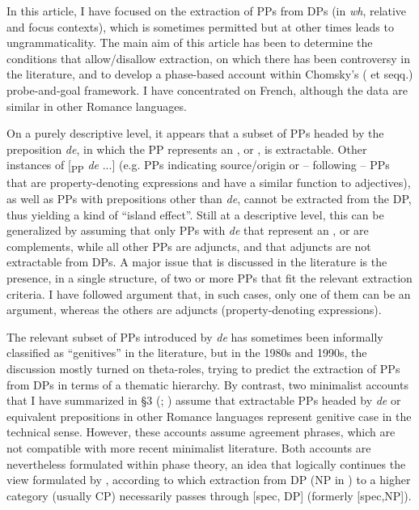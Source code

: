 \documentclass[output=paper]{langsci/langscibook}
\begin{document}
In this article, I have focused on the extraction of PPs from DPs (in \textit{wh}, relative and focus contexts), which is sometimes permitted but at other times leads to ungrammaticality. The main aim of this article has been to determine the conditions that allow/disallow extraction, on which there has been controversy in the literature, and to develop a phase-based account within Chomsky’s (\citeyear{Chomsky2000} et seqq.) probe-and-goal framework. I have concentrated on French, although the data are similar in other Romance languages.

On a purely descriptive level, it appears that a subset of PPs headed by the preposition \textit{de}, in which the PP represents an \AGENT, \THEME or \POSSESSOR, is extractable. Other instances of [\textsubscript{PP} \textit{de} ...] (e.g. PPs indicating source/origin or – following \citealt{Kolliakou1999} – PPs that are property-denoting expressions and have a similar function to adjectives), as well as PPs with prepositions other than \textit{de}, cannot be extracted from the DP, thus yielding a kind of “island effect”. Still at a descriptive level, this can be generalized by assuming that only PPs with \textit{de} that represent an \AGENT, \THEME or \POSSESSOR are complements, while all other PPs are adjuncts, and that adjuncts are not extractable from DPs. A major issue that is discussed in the literature is the presence, in a single structure, of two or more PPs that fit the relevant extraction criteria. I have followed  argument that, in such cases, only one of them can be an argument, whereas the others are adjuncts (property-denoting expressions).

The relevant subset of PPs introduced by \textit{de} has sometimes been informally classified as “genitives” in the literature, but in the 1980s and 1990s, the discussion mostly turned on theta-roles, trying to predict the extraction of PPs from DPs in terms of a thematic hierarchy. By contrast, two minimalist accounts that I have summarized in §3 (\citealt{Gutiérrez-Bravo2001}; \citealt{Cinque2014}) assume that extractable PPs headed by \textit{de} or equivalent prepositions in other Romance languages represent genitive case in the technical sense. However, these accounts assume agreement phrases, which are not compatible with more recent minimalist literature. Both accounts are nevertheless formulated within phase theory, an idea that logically continues the view formulated by \citet{Cinque1980}, according to which extraction from DP (NP in \citealt{Cinque1980}) to a higher category (usually CP) necessarily passes through [spec, DP] (formerly [spec,NP]). 
\end{document}
